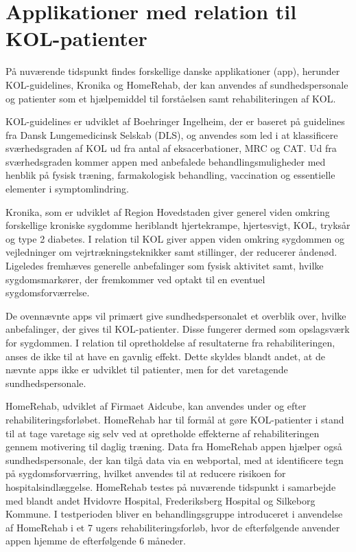 \section{Applikationer med relation til KOL-patienter}
På nuværende tidspunkt findes forskellige danske applikationer (app), herunder KOL-guidelines, Kronika og HomeRehab, der kan anvendes af  sundhedspersonale og patienter som et hjælpemiddel til forståelsen samt rehabiliteringen af KOL.\cite{KOLguidelines2012,Kronika2014,HealthcareDenmark2017} 

KOL-guidelines er udviklet af Boehringer Ingelheim, der er baseret på guidelines fra Dansk Lungemedicinsk Selskab (DLS), og anvendes som led i at klassificere sværhedsgraden af KOL ud fra antal af eksacerbationer, MRC og CAT. Ud fra sværhedsgraden kommer appen med anbefalede behandlingsmuligheder med henblik på fysisk træning, farmakologisk behandling, vaccination og essentielle elementer i symptomlindring.\cite{KOLguidelines2012}    

Kronika, som er udviklet af Region Hovedstaden giver generel viden omkring forskellige kroniske sygdomme heriblandt hjertekrampe, hjertesvigt, KOL, tryksår og type 2 diabetes. I relation til KOL giver appen viden omkring sygdommen og vejledninger om vejrtrækningsteknikker samt stillinger, der reducerer åndenød. Ligeledes fremhæves generelle anbefalinger som fysisk aktivitet samt,  hvilke sygdomsmarkører, der fremkommer ved optakt til en eventuel sygdomsforværrelse.\cite{Kronika2014}    

De ovennævnte apps vil primært give sundhedspersonalet et overblik over, hvilke anbefalinger, der gives til KOL-patienter. Disse fungerer dermed som opslagsværk for sygdommen. I relation til opretholdelse af resultaterne fra rehabiliteringen, anses de ikke til at have en gavnlig effekt. 
Dette skyldes blandt andet, at de nævnte apps ikke er udviklet til patienter, men for det varetagende sundhedspersonale.\cite{Kronika2014}  

HomeRehab, udviklet af Firmaet Aidcube, kan anvendes under og efter rehabiliteringsforløbet. HomeRehab har til formål at gøre KOL-patienter i stand til at tage varetage sig selv ved at opretholde effekterne af rehabiliteringen gennem motivering til daglig træning. Data fra HomeRehab appen hjælper også sundhedspersonale, der kan tilgå data via en webportal, med at identificere tegn på sygdomsforværring, hvilket anvendes til at reducere risikoen for hospitalsindlæggelse. HomeRehab testes på nuværende tidspunkt i samarbejde med blandt andet Hvidovre Hospital, Frederiksberg Hospital og Silkeborg Kommune. 
I testperioden bliver en behandlingsgruppe introduceret i anvendelse af HomeRehab i et 7 ugers rehabiliteringsforløb, hvor de efterfølgende anvender appen hjemme de efterfølgende 6 måneder.\cite{HealthcareDenmark2017}

